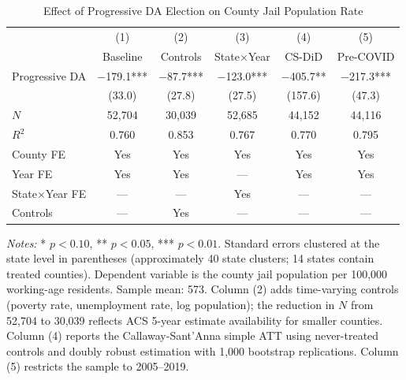 \documentclass[12pt]{article}
\begin{document}
\begin{table}[H]
\centering
\caption{Effect of Progressive DA Election on County Jail Population Rate}
\label{tab:first_stage}
\begin{threeparttable}
\begin{tabular}{lccccc}
\toprule
& (1) & (2) & (3) & (4) & (5) \\
& Baseline & Controls & State$\times$Year & CS-DiD & Pre-COVID \\
\midrule
Progressive DA & $-$179.1*** & $-$87.7*** & $-$123.0*** & $-$405.7** & $-$217.3*** \\
& (33.0) & (27.8) & (27.5) & (157.6) & (47.3) \\
\midrule
$N$ & 52,704 & 30,039 & 52,685 & 44,152 & 44,116 \\
$R^2$ & 0.760 & 0.853 & 0.767 & 0.770 & 0.795 \\
County FE & Yes & Yes & Yes & Yes & Yes \\
Year FE & Yes & Yes & --- & Yes & Yes \\
State$\times$Year FE & --- & --- & Yes & --- & --- \\
Controls & --- & Yes & --- & --- & --- \\
\bottomrule
\end{tabular}
\begin{tablenotes}[flushleft]
\small
\item \textit{Notes:} * $p<0.10$, ** $p<0.05$, *** $p<0.01$. Standard errors clustered at the state level in parentheses (approximately 40 state clusters; 14 states contain treated counties). Dependent variable is the county jail population per 100,000 working-age residents. Sample mean: 573. Column (2) adds time-varying controls (poverty rate, unemployment rate, log population); the reduction in $N$ from 52,704 to 30,039 reflects ACS 5-year estimate availability for smaller counties. Column (4) reports the Callaway-Sant'Anna simple ATT using never-treated controls and doubly robust estimation with 1,000 bootstrap replications. Column (5) restricts the sample to 2005--2019.
\end{tablenotes}
\end{threeparttable}
\end{table}
\end{document}
